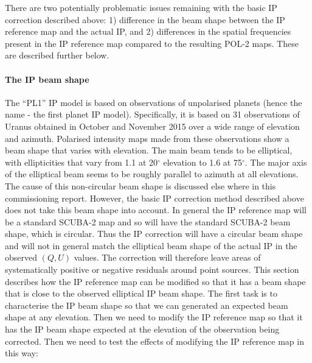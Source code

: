 \documentclass[twoside,11pt]{starlink}
\begin{document}
There are two potentially problematic issues remaining with the basic IP
correction described above: 1) difference in the beam shape between the IP
reference map and the actual IP, and 2) differences in the spatial frequencies
present in the IP reference map compared to the resulting POL-2 maps. These
are described further below.

\paragraph{The IP beam shape}
The ``PL1'' IP model is based on observations of unpolarised planets (hence
the name - the first planet IP model). Specifically, it is based on 31
observations of Uranus obtained in October and November 2015 over a wide
range of elevation and azimuth. Polarised intensity maps made from these
observations show a beam shape that varies with elevation. The main beam tends
to be elliptical, with ellipticities that vary from 1.1 at 20$^\circ$
elevation to 1.6 at 75$^\circ$. The major axis of the elliptical beam
seems to be roughly parallel to azimuth at all elevations. The cause of
this non-circular beam shape is discussed else where in this commissioning
report.  However, the basic IP correction method described above does not
take this beam shape into account. In general the IP reference map will
be a standard SCUBA-2 map and so will have the standard SCUBA-2 beam shape,
which is circular. Thus the IP correction will have a circular beam shape
and will not in general match the elliptical beam shape of the actual IP in
the observed $(Q,U)$ values. The correction will therefore leave areas of
systematically positive or negative residuals around point sources. This
section describes how the IP reference map can be modified so that it has
a beam shape that is close to the observed elliptical IP beam shape. The
first task is to characterise the IP beam shape so that we can generated an
expected beam shape at any elevation. Then we need to modify the IP
reference map so that it has the IP beam shape expected at the elevation
of the observation being corrected. Then we need to test the effects of
modifying the IP reference map in this way:
\end{document}
